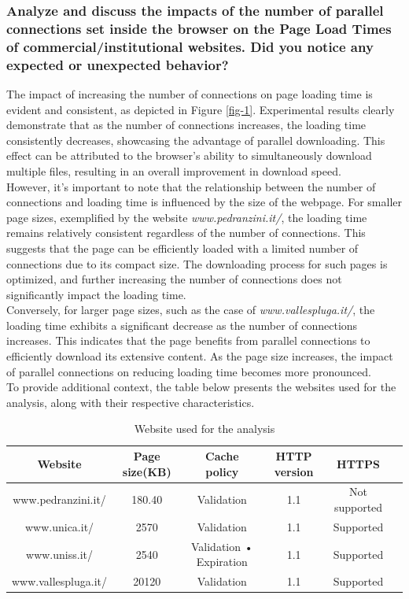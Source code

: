 \documentclass[eng]{class}
\begin{document}
\subsubsection*{Analyze and discuss the impacts of the number of parallel connections set inside the browser
	on the Page Load Times of commercial/institutional websites. Did you notice any expected or
	unexpected behavior?}
The impact of increasing the number of connections on page loading time is evident and consistent, as depicted in Figure \ref{fig-1}.
Experimental results clearly demonstrate that as the number of connections increases, the loading time consistently decreases,
showcasing the advantage of parallel downloading.
This effect can be attributed to the browser's ability to simultaneously download multiple files, resulting in an overall improvement in download speed.\\
However, it's important to note that the relationship between the number of connections and loading time is influenced by the size of the webpage.
For smaller page sizes, exemplified by the website \textit{www.pedranzini.it/}, the loading time remains relatively consistent regardless
of the number of connections. This suggests that the page can be efficiently loaded with a limited number of connections due to its compact size.
The downloading process for such pages is optimized, and further increasing the number of connections does not significantly impact the loading time.\\
Conversely, for larger page sizes, such as the case of \textit{www.vallespluga.it/}, the loading time exhibits a significant decrease as
the number of connections increases. This indicates that the page benefits from parallel connections to efficiently download its extensive content.
As the page size increases, the impact of parallel connections on reducing loading time becomes more pronounced.\\
To provide additional context, the table below presents the websites used for the analysis, along with their respective characteristics.
\begin{table}[H]
	\tiny
	\centering
	\begin{tabular}{|c|c|c|c|c|c|}
		\hline
		\linewidth=0cm
		Website             & Page size(KB) & Cache policy            & HTTP version & HTTPS         \\
		\hline
		www.pedranzini.it/  & 180.40        & Validation              & 1.1          & Not supported \\
		www.unica.it/       & 2570          & Validation              & 1.1          & Supported     \\
		www.uniss.it/       & 2540          & Validation • Expiration & 1.1          & Supported     \\
		www.vallespluga.it/ & 20120         & Validation              & 1.1          & Supported     \\
		\hline
	\end{tabular}
	\caption{Website used for the analysis}
	\label{tab-1}
\end{table}
\end{document}
